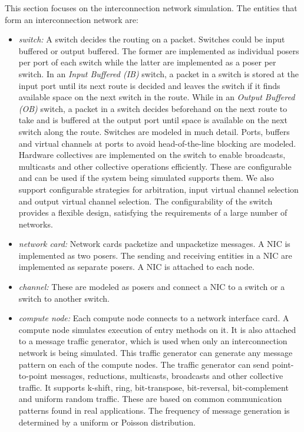 This section focuses on the interconnection network simulation.
The entities that form an interconnection network are:
\begin{itemize}
\item {\it switch:} A switch decides the routing on a packet. Switches could be
input buffered or output buffered. The former are implemented as individual posers
per port of each switch while the latter are implemented as a poser per switch.
In an {\it Input Buffered (IB)} switch, a packet in a switch is stored at the input 
port until its next route is decided and leaves the switch if it finds 
available space on the next switch in the route.
While in an {\it Output Buffered (OB)} switch, a packet in a switch decides beforehand 
on the next route to take and is buffered at the output port until space is
available on the next switch along the route.
Switches are modeled in much detail. Ports, buffers and
virtual channels at ports to avoid head-of-the-line blocking are
modeled.  Hardware collectives are implemented on the switch to
enable broadcasts, multicasts and other collective operations
efficiently. These are configurable and can be used if the system
being simulated supports them. We also support configurable
strategies for arbitration, input virtual channel selection and output
virtual channel selection. The configurability of the switch
provides a flexible design, satisfying the requirements of
a large number of networks.

\item {\it network card:} Network cards packetize and unpacketize messages.
A NIC is implemented as two posers. The sending and receiving entities in a
NIC are implemented as separate posers. A NIC is attached to each node.
\item {\it channel:} These are modeled as posers and connect a NIC to a switch
or a switch to another switch.
\item {\it compute node:} Each compute node connects to a network interface card.
A compute node simulates execution of entry methods on it. It is also attached
to a message traffic generator, which is used when only an interconnection
network is being simulated. This traffic generator can generate any message
pattern on each of the compute nodes.
The traffic generator can send
point-to-point messages, reductions, multicasts, broadcasts and other
collective traffic.  It supports k-shift, ring, bit-transpose,
bit-reversal, bit-complement and uniform random traffic.
These are based on common communication patterns found in
real applications. The frequency of message generation is determined
by a uniform or Poisson distribution.
\end{itemize}


